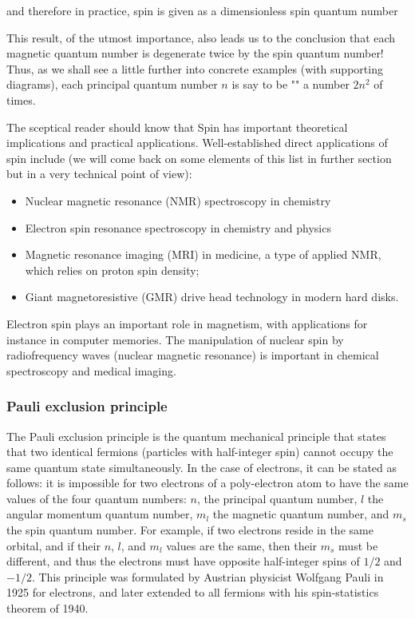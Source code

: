     and therefore in practice, spin is given as a dimensionless spin quantum number 
     
    This result, of the utmost importance, also leads us to the conclusion that each magnetic quantum number is degenerate twice by the spin quantum number! Thus, as we shall see a little further into concrete examples (with supporting diagrams), each principal quantum number $n$ is say to be "" a number $2n^2$ of times.
    
    The sceptical reader should know that Spin has important theoretical implications and practical applications. Well-established direct applications of spin include (we will come back on some elements of this list in further section but in a very technical point of view):
   \begin{itemize}
      \item Nuclear magnetic resonance (NMR) spectroscopy in chemistry
      \item Electron spin resonance spectroscopy in chemistry and physics
      \item Magnetic resonance imaging (MRI) in medicine, a type of applied NMR, which relies on proton spin density;
      \item Giant magnetoresistive (GMR) drive head technology in modern hard disks.
   \end{itemize}
    Electron spin plays an important role in magnetism, with applications for instance in computer memories. The manipulation of nuclear spin by radiofrequency waves (nuclear magnetic resonance) is important in chemical spectroscopy and medical imaging.
     
    \pagebreak
    \subsubsection{Pauli exclusion principle}\label{pauli exclusion principle}
    The Pauli exclusion principle is the quantum mechanical principle that states that two identical fermions (particles with half-integer spin) cannot occupy the same quantum state simultaneously. In the case of electrons, it can be stated as follows: it is impossible for two electrons of a poly-electron atom to have the same values of the four quantum numbers: $n$, the principal quantum number, $l$ the angular momentum quantum number, $m_l$ the magnetic quantum number, and $m_s$ the spin quantum number. For example, if two electrons reside in the same orbital, and if their $n$, $l$, and $m_l$ values are the same, then their $m_s$ must be different, and thus the electrons must have opposite half-integer spins of $1/2$ and $-1/2$. This principle was formulated by Austrian physicist Wolfgang Pauli in 1925 for electrons, and later extended to all fermions with his spin-statistics theorem of 1940.
    
